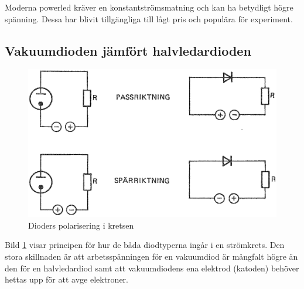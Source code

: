 Moderna powerled kräver en konstantströmsmatning och kan ha betydligt
högre spänning.
Dessa har blivit tillgängliga till lågt pris och populära för experiment.

\subsection{Vakuumdioden jämfört halvledardioden}

\begin{figure}
\includegraphics[width=\textwidth]{images/cropped_pdfs/bild_2_2-15.pdf}
\caption{Dioders polarisering i kretsen}
\label{fig:BildII2-15}
\end{figure}

Bild \ref{fig:BildII2-15} visar principen för hur de båda diodtyperna ingår i
en strömkrets.
Den stora skillnaden är att arbetsspänningen för en vakuumdiod är mångfalt
högre än den för en halvledardiod samt att vakuumdiodens ena elektrod (katoden)
behöver hettas upp för att avge elektroner.
